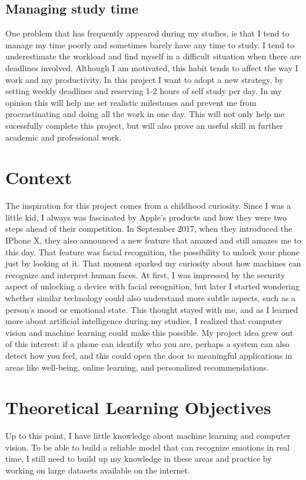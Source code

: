 \documentclass[12pt,a4paper]{article}
\begin{document}
\subsection{Managing study time}
One problem that has frequently appeared during my studies, is that I tend to manage my time poorly and sometimes barely have any time to study. I tend to underestimate the workload and find myself in a difficult situation when there are deadlines involved. Although I am motivated, this habit tends to affect the way I work and my productivity. In this project I want to adopt a new strategy, by setting weekly deadlines and reserving 1-2 hours of self study per day. In my opinion this will help me set realistic milestones and prevent me from procrastinating and doing all the work in one day. This will not only help me sucessfully complete this project, but will also prove an useful skill in further academic and professional work.

\section{Context}
The inspiration for this project comes from a childhood curiosity. Since I was a little kid, I always was fascinated by Apple's products and how they were two steps ahead of their competition. In September 2017, when they introduced the IPhone X, they also announced a new feature that amazed and still amazes me to this day. That feature was facial recognition, the possibility to unlock your phone just by looking at it. That moment sparked my curiosity about how machines can recognize and interpret human faces. At first, I was impressed by the security aspect of unlocking a device with facial recognition, but later I started wondering whether similar technology could also understand more subtle aspects, such as a person’s mood or emotional state. This thought stayed with me, and as I learned more about artificial intelligence during my studies, I realized that computer vision and machine learning could make this possible. My project idea grew out of this interest: if a phone can identify who you are, perhaps a system can also detect how you feel, and this could open the door to meaningful applications in areas like well-being, online learning, and personalized recommendations.

\section{Theoretical Learning Objectives}
Up to this point, I have little knowledge about machine learning and computer vision. To be able to build a reliable model that can recognize emotions in real time, I still need to build up my knowledge in these areas and practice by working on large datasets available on the internet.
\end{document}
